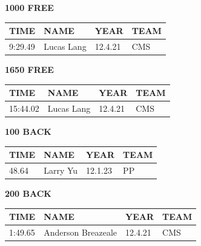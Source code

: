 \begin{table}[H]
\centering
\begin{minipage}[t]{0.48\textwidth}
\centering
\textbf{1000 FREE}\\[0.1cm]
\begin{tabular}{@{}p{1.8cm}p{2.8cm}p{1.2cm}p{1.4cm}@{}}
\hline
    \textbf{TIME} & \textbf{NAME} & \textbf{YEAR} & \textbf{TEAM} \\
\hline
    9:29.49 & Lucas Lang & 12.4.21 & CMS \\
\hline
\end{tabular}
\end{minipage}\hfill
\begin{minipage}[t]{0.48\textwidth}
\centering
\textbf{1650 FREE}\\[0.1cm]
\begin{tabular}{@{}p{1.8cm}p{2.8cm}p{1.2cm}p{1.4cm}@{}}
\hline
    \textbf{TIME} & \textbf{NAME} & \textbf{YEAR} & \textbf{TEAM} \\
\hline
    15:44.02 & Lucas Lang & 12.4.21 & CMS \\
\hline
\end{tabular}
\end{minipage}
\end{table}

\begin{table}[H]
\centering
\begin{minipage}[t]{0.48\textwidth}
\centering
\textbf{100 BACK}\\[0.1cm]
\begin{tabular}{@{}p{1.8cm}p{2.8cm}p{1.2cm}p{1.4cm}@{}}
\hline
    \textbf{TIME} & \textbf{NAME} & \textbf{YEAR} & \textbf{TEAM} \\
\hline
    48.64 & Larry Yu & 12.1.23 & PP \\
\hline
\end{tabular}
\end{minipage}\hfill
\begin{minipage}[t]{0.48\textwidth}
\centering
\textbf{200 BACK}\\[0.1cm]
\begin{tabular}{@{}p{1.8cm}p{2.8cm}p{1.2cm}p{1.4cm}@{}}
\hline
    \textbf{TIME} & \textbf{NAME} & \textbf{YEAR} & \textbf{TEAM} \\
\hline
    1:49.65 & Anderson Breazeale & 12.4.21 & CMS \\
\hline
\end{tabular}
\end{minipage}
\end{table}

